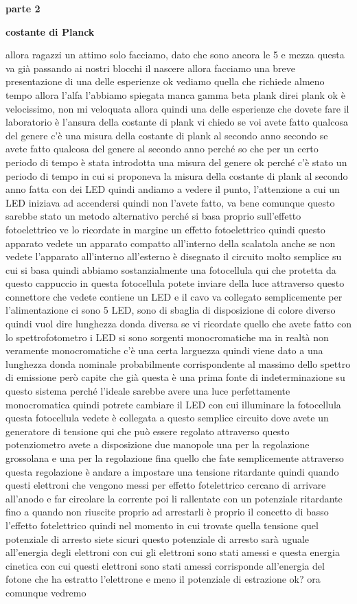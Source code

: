 \textbf{parte 2}

\textbf{costante di Planck}

allora ragazzi un attimo solo facciamo, dato che sono ancora le 5 e mezza questa va già passando ai nostri blocchi il nascere allora facciamo una breve presentazione di una delle esperienze ok vediamo quella che richiede almeno tempo allora l'alfa l'abbiamo spiegata manca gamma beta plank direi plank ok è velocissimo, non mi veloquata allora quindi una delle esperienze che dovete fare il laboratorio è l'ansura della costante di plank vi chiedo se voi avete fatto qualcosa del genere c'è una misura della costante di plank al secondo anno secondo se avete fatto qualcosa del genere al secondo anno perché so che per un certo periodo di tempo è stata introdotta una misura del genere ok perché c'è stato un periodo di tempo in cui si proponeva la misura della costante di plank al secondo anno fatta con dei LED quindi andiamo a vedere il punto, l'attenzione a cui un LED iniziava ad accendersi quindi non l'avete fatto, va bene comunque questo sarebbe stato un metodo alternativo perché si basa proprio sull'effetto fotoelettrico ve lo ricordate in margine un effetto fotoelettrico quindi questo apparato vedete un apparato compatto all'interno della scalatola anche se non vedete l'apparato all'interno all'esterno è disegnato il circuito molto semplice su cui si basa quindi abbiamo sostanzialmente una fotocellula qui che protetta da questo cappuccio in questa fotocellula potete inviare della luce attraverso questo connettore che vedete contiene un LED e il cavo va collegato semplicemente per l'alimentazione ci sono 5 LED, sono di sbaglia di disposizione di colore diverso quindi vuol dire lunghezza donda diversa se vi ricordate quello che avete fatto con lo spettrofotometro i LED si sono sorgenti monocromatiche ma in realtà non veramente monocromatiche c'è una certa larguezza quindi viene dato a una lunghezza donda nominale probabilmente corrispondente al massimo dello spettro di emissione però capite che già questa è una prima fonte di indeterminazione su questo sistema perché l'ideale sarebbe avere una luce perfettamente monocromatica quindi potrete cambiare il LED con cui illuminare la fotocellula questa fotocellula vedete è collegata a questo semplice circuito dove avete un generatore di tensione qui che può essere regolato attraverso questo potenziometro avete a disposizione due manopole una per la regolazione grossolana e una per la regolazione fina quello che fate semplicemente attraverso questa regolazione è andare a impostare una tensione ritardante quindi quando questi elettroni che vengono messi per effetto fotelettrico cercano di arrivare all'anodo e far circolare la corrente poi li rallentate con un potenziale ritardante fino a quando non riuscite proprio ad arrestarli è proprio il concetto di basso l'effetto fotelettrico quindi nel momento in cui trovate quella tensione quel potenziale di arresto siete sicuri questo potenziale di arresto sarà uguale all'energia degli elettroni con cui gli elettroni sono stati amessi e questa energia cinetica con cui questi elettroni sono stati amessi corrisponde all'energia del fotone che ha estratto l'elettrone e meno il potenziale di estrazione ok? ora comunque vedremo 